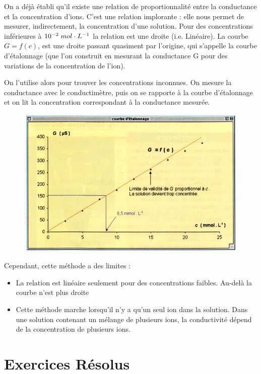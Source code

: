 \documentclass[11pt,a4paper]{article}
\begin{document}
On a déjà établi qu’il existe une relation de proportionnalité entre la conductance et la concentration d’ions.  C’est une relation implorante : elle nous permet de mesurer, indirectement, la concentration d’une solution. 
Pour des concentrations inférieures à $10^{-2}\; mol\cdot L^{-1}$ la relation est une droite (i.e. Linéaire).  La courbe $G=f(c)$, est une droite passant quasiment par l’origine, qui s’appelle la courbe d’étalonnage (que l’on construit en mesurant la conductance G pour des variations de la concentration de l’ion).  

On l’utilise alors pour trouver les concentrations inconnues.  On mesure la conductance avec le conductimètre, puis on se rapporte à la courbe d’étalonnage et on lit la concentration correspondant à la conductance mesurée. 

\begin{figure}[h]
    \centering
    \includegraphics[width=0.8\linewidth]{imgs/c1/etalonnage.jpg}
\end{figure} 

Cependant, cette méthode a des limites :
\begin{itemize}
    \item La relation est linéaire seulement pour des concentrations faibles.  Au-delà la courbe n’est plus droite
    \item Cette méthode marche lorsqu’il n’y a qu’un seul ion dans la solution.  Dans une solution contenant un mélange de plusieurs ions, la conductivité dépend de la concentration de plusieurs ions.
\end{itemize}
\newpage	 
\section{Exercices Résolus}	 
\end{document}
